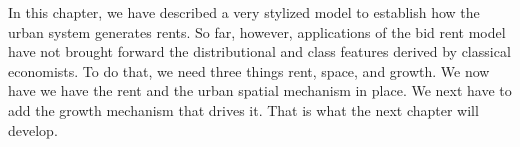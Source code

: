 In this chapter, we have described a very stylized model to establish how the urban system generates rents.
So far, however, applications of the bid rent model have not brought forward the distributional and class features derived by classical economists. To do that, we need three things rent, space, and growth. We now have we have the rent and the urban spatial mechanism in place. We next have to add the growth mechanism that drives it. That is what the next chapter will develop.






